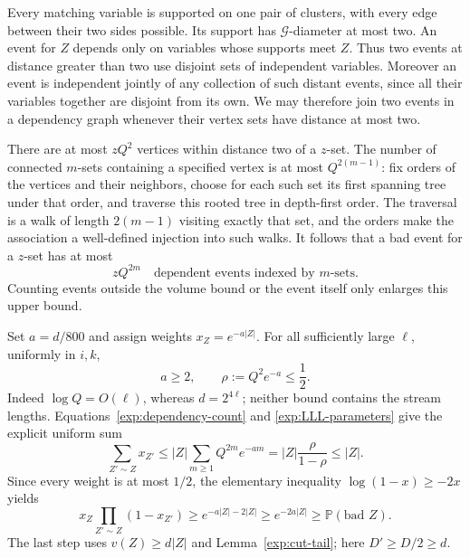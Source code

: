 Every matching variable is supported on one pair of clusters, with
every edge between their two sides possible. Its support has
$\mathcal G$-diameter at most two. An event for $Z$ depends only
on variables whose supports meet $Z$. Thus two events at distance
greater than two use disjoint sets of independent variables.
Moreover an event is independent jointly of any collection of such
distant events, since all their variables together are disjoint from
its own. We may therefore join two events in a dependency graph
whenever their vertex sets have distance at most two.

There are at most $zQ^2$ vertices within distance two of a $z$-set.
The number of connected $m$-sets containing a specified vertex is
at most $Q^{2(m-1)}$: fix orders of the vertices and their neighbors,
choose for each such set its first spanning tree under that order,
and traverse this rooted tree in depth-first order. The traversal
is a walk of length $2(m-1)$ visiting exactly that set, and the
orders make the association a well-defined injection into such
walks. It follows that a bad event for a $z$-set has at most
\begin{equation}
 zQ^{2m}\quad\text{dependent events indexed by $m$-sets}.
 \label{exp:dependency-count}
\end{equation}
Counting events outside the volume bound or the event itself only
enlarges this upper bound.

Set $a=d/800$ and assign weights $x_Z=e^{-a|Z|}$. For all sufficiently
large $\ell$, uniformly in $i,k$,
\begin{equation}
 a\geq2,\qquad \rho:=Q^2e^{-a}\leq\frac12.
 \label{exp:LLL-parameters}
\end{equation}
Indeed $\log Q=O(\ell)$, whereas $d=2^{4\ell}$; neither bound
contains the stream lengths. Equations~\eqref{exp:dependency-count}
and \eqref{exp:LLL-parameters} give the explicit uniform sum
\begin{equation}
 \sum_{Z'\sim Z}x_{Z'}
 \leq |Z|\sum_{m\geq1}Q^{2m}e^{-am}
 =|Z|\frac{\rho}{1-\rho}\leq|Z|.
 \label{exp:dependency-sum}
\end{equation}
Since every weight is at most $1/2$, the elementary inequality
$\log(1-x)\geq-2x$ yields
\[
 x_Z\prod_{Z'\sim Z}(1-x_{Z'})
 \geq e^{-a|Z|-2|Z|}\geq e^{-2a|Z|}
 \geq\mathbb P(\text{bad }Z).
\]
The last step uses $v(Z)\geq d|Z|$ and
Lemma~\ref{exp:cut-tail}; here $D'\geq D/2\geq d$.

